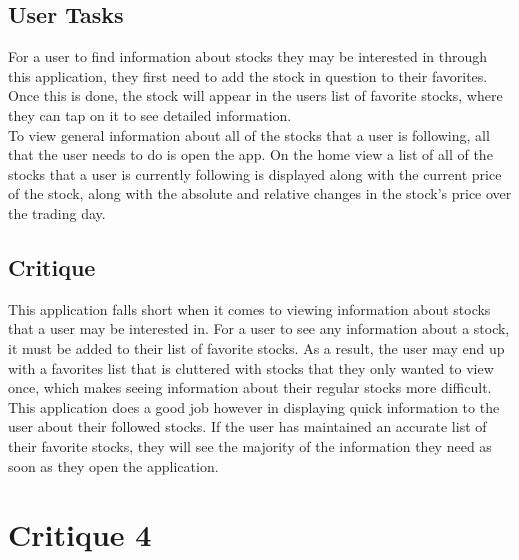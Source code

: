 \documentclass{sigchi}
\begin{document}

\subsection{User Tasks}
For a user to find information about stocks they may be interested in through this application, they first need to add the stock in question to their favorites.  Once this is done, the stock will appear in the users list of favorite stocks, where they can tap on it to see detailed information.\\
To view general information about all of the stocks that a user is following, all that the user needs to do is open the app.  On the home view a list of all of the stocks that a user is currently following is displayed along with the current price of the stock, along with the absolute and relative changes in the stock's price over the trading day.

\subsection{Critique}
This application falls short when it comes to viewing information about stocks that a user may be interested in.  For a user to see any information about a stock, it must be added to their list of favorite stocks.  As a result, the user may end up with a favorites list that is cluttered with stocks that they only wanted to view once, which makes seeing information about their regular stocks more difficult.  This application does a good job however in displaying quick information to the user about their followed stocks.  If the user has maintained an accurate list of their favorite stocks, they will see the majority of the information they need as soon as they open the application.



\section{Critique 4}
\end{document}
